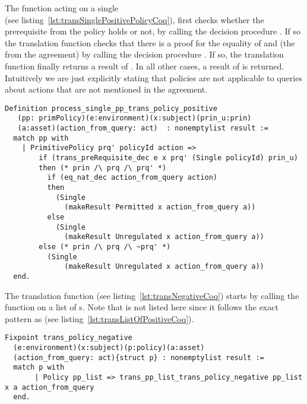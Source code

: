 The function  acting on a single \\  (see listing~\ref{lst:transSinglePositivePolicyCoq}), first checks whether the prerequisite from the policy holds or not, by calling the decision procedure . If so the translation function checks that there is a proof for the equality of  and  (the  from the agreement) by calling the decision procedure . If so, the translation function finally returns a result of . In all other cases, a result of  is returned. Intuitively we are just explicitly stating that policies are not applicable to queries about actions that are not mentioned in the agreement. 


\begin{minipage}{\linewidth}
\begin{lstlisting}
Definition process_single_pp_trans_policy_positive 
   (pp: primPolicy)(e:environment)(x:subject)(prin_u:prin)
   (a:asset)(action_from_query: act)  : nonemptylist result :=
  match pp with
    | PrimitivePolicy prq' policyId action =>
        if (trans_preRequisite_dec e x prq' (Single policyId) prin_u)
        then (* prin /\ prq /\ prq' *)
          if (eq_nat_dec action_from_query action)
          then
            (Single 
              (makeResult Permitted x action_from_query a))
          else
            (Single 
              (makeResult Unregulated x action_from_query a))
        else (* prin /\ prq /\ ~prq' *)
          (Single 
              (makeResult Unregulated x action_from_query a))
  end.
\end{lstlisting}
\end{minipage}


The  translation function (see listing~\ref{lst:transNegativeCoq}) starts by calling the function  on a list of s. Note that  is not listed here since it follows the exact pattern as  (see listing~\ref{lst:transListOfPositiveCoq}).

\begin{minipage}[c]{0.95\textwidth}
\begin{lstlisting}
Fixpoint trans_policy_negative
  (e:environment)(x:subject)(p:policy)(a:asset)
  (action_from_query: act){struct p} : nonemptylist result :=  
  match p with  
       | Policy pp_list => trans_pp_list_trans_policy_negative pp_list x a action_from_query
  end.
\end{lstlisting}
\end{minipage}

